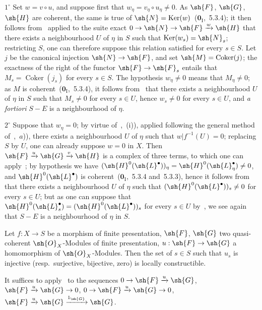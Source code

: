 $1^\circ$ Set $w=v\circ u$, and suppose first that $w_\eta=v_\eta\circ u_\eta\neq 0$.
As $\sh{F}$, $\sh{G}$, $\sh{H}$ are coherent, the same is true of $\sh{N}=\operatorname{Ker}(w)$~($\mathbf{0}_{\mathrm{I}}$,~5.3.4); it then follows from~ applied to the suite exact $0\to\sh{N}\to\sh{F}\xrightarrow{w}\sh{H}$ that there exists a neighbourhood $U$ of $\eta$ in $S$ such that $\operatorname{Ker}(w_s)=\sh{N}_s$; restricting $S$, one can therefore suppose this relation satisfied for every $s\in S$.
Let $j$ be the canonical injection $\sh{N}\to\sh{F}$, and set $\sh{M}=\operatorname{Coker}(j)$; the exactness of the right of the functor $\sh{F}\to\sh{F}_s$ entails that $M_s=\operatorname{Coker}(j_s)$ for every $s\in S$.
The hypothesis $w_\eta\neq 0$ means that $M_\eta\neq 0$; as $M$ is coherent~($\mathbf{0}_{\mathrm{I}}$,~5.3.4), it follows from~ that there exists a neighbourhood $U$ of $\eta$ in $S$ such that $M_s\neq 0$ for every $s\in U$, hence $w_s\neq 0$ for every $s\in U$, and \emph{a fortiori} $S-E$ is a neighbourhood of $\eta$.

$2^\circ$ Suppose that $w_\eta=0$; by virtue of~,~(i)), applied following the general method of~,~$a$)), there exists a neighbourhood $U$ of $\eta$ such that $w|f^{-1}(U)=0$; replacing $S$ by $U$, one can already suppose $w=0$ in $X$.
Then $\sh{F}\xrightarrow{u}\sh{G}\xrightarrow{v}\sh{H}$ is a complex of three terms, to which one can apply~; by hypothesis we have $(\sh{H}^0(\sh{L}^\bullet))_\eta=\sh{H}^0(\sh{L}^\bullet_\eta)\neq 0$, and $\sh{H}^0(\sh{L}^\bullet)$ is coherent~($\mathbf{0}_{\mathrm{I}}$,~5.3.4 and~5.3.3), hence it follows from~ that there exists a neighbourhood $U$ of $\eta$ such that $(\sh{H}^0(\sh{L}^\bullet))_s\neq 0$ for every $s\in U$; but as one can suppose that $\sh{H}^0(\sh{L}^\bullet_s)=(\sh{H}^0(\sh{L}^\bullet))_s$ for every $s\in U$ by~, we see again that $S-E$ is a neighbourhood of $\eta$ in $S$.

\begin{corollary}[9.4.5]
\label{IV.9.4.5}
Let $f:X\to S$ be a morphism of finite presentation, $\sh{F}$, $\sh{G}$ two quasi-coherent $\sh{O}_X$-Modules of finite presentation, $u:\sh{F}\to\sh{G}$ a homomorphism of $\sh{O}_X$-Modules.
Then the set of $s\in S$ such that $u_s$ is injective \textnormal{(}resp.\ surjective, bijective, zero\textnormal{)} is locally constructible.
\end{corollary}

It suffices to apply~ to the sequences $0\to\sh{F}\xrightarrow{u}\sh{G}$, $\sh{F}\xrightarrow{u}\sh{G}\to 0$, $0\to\sh{F}\xrightarrow{u}\sh{G}\to 0$, $\sh{F}\xrightarrow{u}\sh{G}\xrightarrow{1_\sh{G}}\sh{G}$.

